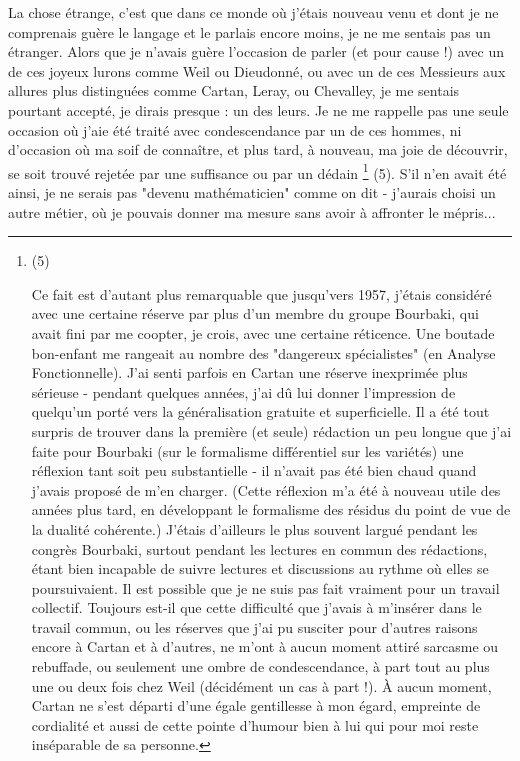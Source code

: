 La chose étrange, c'est que dans ce monde où j'étais nouveau venu et dont je ne comprenais guère le langage et le parlais encore moins, je ne me sentais pas un étranger. Alors que je n'avais guère l'occasion de parler (et pour cause !) avec un de ces joyeux lurons comme Weil ou Dieudonné, ou avec un de ces Messieurs aux allures plus distinguées comme Cartan, Leray, ou Chevalley, je me sentais pourtant accepté, je dirais presque : un des leurs. Je ne me rappelle pas une seule occasion où j'aie été traité avec condescendance par un de ces hommes, ni d'occasion où ma soif de connaître, et plus tard, à nouveau, ma joie de découvrir, se soit trouvé rejetée par une suffisance ou par un dédain \footnote{(5)\par Ce fait est d'autant plus remarquable que jusqu'vers 1957, j'étais considéré avec une certaine réserve par plus d'un membre du groupe Bourbaki, qui avait fini par me coopter, je crois, avec une certaine réticence. Une boutade bon-enfant me rangeait au nombre des "dangereux spécialistes" (en Analyse Fonctionnelle). J'ai senti parfois en Cartan une réserve inexprimée plus sérieuse - pendant quelques années, j'ai dû lui donner l'impression de quelqu'un porté vers la généralisation gratuite et superficielle. Il a été tout surpris de trouver dans la première (et seule) rédaction un peu longue que j'ai faite pour Bourbaki (sur le formalisme différentiel sur les variétés) une réflexion tant soit peu substantielle - il n'avait pas été bien chaud quand j'avais proposé de m'en charger. (Cette réflexion m'a été à nouveau utile des années plus tard, en développant le formalisme des résidus du point de vue de la dualité cohérente.) J'étais d'ailleurs le plus souvent largué pendant les congrès Bourbaki, surtout pendant les lectures en commun des rédactions, étant bien incapable de suivre lectures et discussions au rythme où elles se poursuivaient. Il est possible que je ne suis pas fait vraiment pour un travail collectif. Toujours est-il que cette difficulté que j'avais à m'insérer dans le travail commun, ou les réserves que j'ai pu susciter pour d'autres raisons encore à Cartan et à d'autres, ne m'ont à aucun moment attiré sarcasme ou rebuffade, ou seulement une ombre de condescendance, à part tout au plus une ou deux fois chez Weil (décidément un cas à part !). À aucun moment, Cartan ne s'est départi d'une égale gentillesse à mon égard, empreinte de cordialité et aussi de cette pointe d'humour bien à lui qui pour moi reste inséparable de sa personne.} (5). S'il n'en avait été ainsi, je ne serais pas "devenu mathématicien" comme on dit - j'aurais choisi un autre métier, où je pouvais donner ma mesure sans avoir à affronter le mépris...

